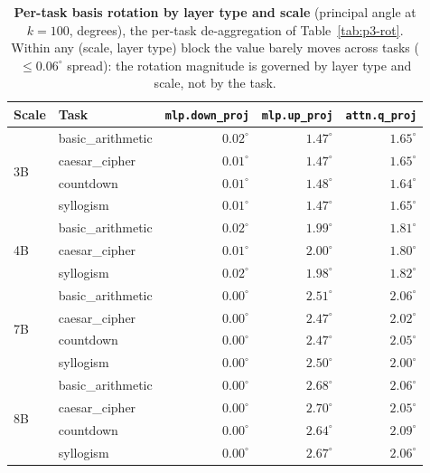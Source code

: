 \documentclass{article}
\newcommand{\dg}{^{\circ}}
\begin{document}
\begin{table}[h]
\centering\small
\caption{\textbf{Per-task basis rotation by layer type and scale} (principal angle at $k{=}100$,
degrees), the per-task de-aggregation of Table~\ref{tab:p3-rot}. Within any (scale, layer type) block
the value barely moves across tasks ($\leq0.06\dg$ spread): the rotation magnitude is governed by
layer type and scale, not by the task.}
\label{tab:p3-pertask-rot}
\begin{tabular}{llrrr}
\toprule
Scale & Task & \texttt{mlp.down\_proj} & \texttt{mlp.up\_proj} & \texttt{attn.q\_proj}\\
\midrule
\multirow{4}{*}{3B}
 & basic\_arithmetic & $0.02\dg$ & $1.47\dg$ & $1.65\dg$\\
 & caesar\_cipher    & $0.01\dg$ & $1.47\dg$ & $1.65\dg$\\
 & countdown         & $0.01\dg$ & $1.48\dg$ & $1.64\dg$\\
 & syllogism         & $0.01\dg$ & $1.47\dg$ & $1.65\dg$\\
\midrule
\multirow{3}{*}{4B}
 & basic\_arithmetic & $0.02\dg$ & $1.99\dg$ & $1.81\dg$\\
 & caesar\_cipher    & $0.01\dg$ & $2.00\dg$ & $1.80\dg$\\
 & syllogism         & $0.02\dg$ & $1.98\dg$ & $1.82\dg$\\
\midrule
\multirow{4}{*}{7B}
 & basic\_arithmetic & $0.00\dg$ & $2.51\dg$ & $2.06\dg$\\
 & caesar\_cipher    & $0.00\dg$ & $2.47\dg$ & $2.02\dg$\\
 & countdown         & $0.00\dg$ & $2.47\dg$ & $2.05\dg$\\
 & syllogism         & $0.00\dg$ & $2.50\dg$ & $2.00\dg$\\
\midrule
\multirow{4}{*}{8B}
 & basic\_arithmetic & $0.00\dg$ & $2.68\dg$ & $2.06\dg$\\
 & caesar\_cipher    & $0.00\dg$ & $2.70\dg$ & $2.05\dg$\\
 & countdown         & $0.00\dg$ & $2.64\dg$ & $2.09\dg$\\
 & syllogism         & $0.00\dg$ & $2.67\dg$ & $2.06\dg$\\
\bottomrule
\end{tabular}
\end{table}
\end{document}
